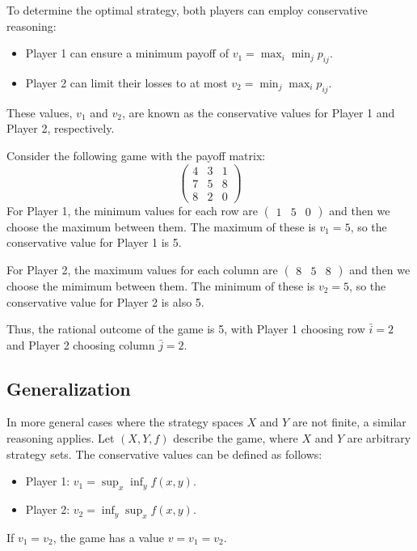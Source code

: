To determine the optimal strategy, both players can employ conservative reasoning: 
\begin{itemize} 
    \item Player 1 can ensure a minimum payoff of $v_1 = \max_i \min_j p_{ij}$. 
    \item Player 2 can limit their losses to at most $v_2 = \min_j \max_i p_{ij}$. 
\end{itemize}
These values, $v_1$ and $v_2$, are known as the conservative values for Player 1 and Player 2, respectively.
\begin{example}
    Consider the following game with the payoff matrix:
    \[\begin{pmatrix} 4 & 3 & 1 \\ 7 & 5 & 8 \\ 8 & 2 & 0 \end{pmatrix}\]
    For Player 1, the minimum values for each row are $\begin{pmatrix} 1 & 5 & 0 \end{pmatrix}$ and then we choose the maximum between them.
    The maximum of these is $v_1 = 5$, so the conservative value for Player 1 is 5.

    For Player 2, the maximum values for each column are $\begin{pmatrix} 8 & 5 & 8 \end{pmatrix}$ and then we choose the mimimum between them.
    The minimum of these is $v_2 = 5$, so the conservative value for Player 2 is also 5.

    Thus, the rational outcome of the game is 5, with Player 1 choosing row $\bar{i} = 2$ and Player 2 choosing column $\bar{j} = 2$.
\end{example}

\subsection{Generalization}
In more general cases where the strategy spaces $X$ and $Y$ are not finite, a similar reasoning applies. 
Let $(X, Y, f)$ describe the game, where $X$ and $Y$ are arbitrary strategy sets. 
The conservative values can be defined as follows: 
\begin{itemize} 
    \item Player 1: $v_1 = \sup_x \inf_y f(x, y)$.
    \item Player 2: $v_2 = \inf_y \sup_x f(x, y)$. 
\end{itemize}
If $v_1 = v_2$, the game has a value $v = v_1 = v_2$.